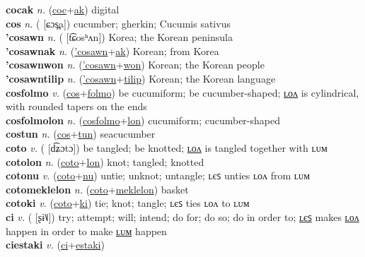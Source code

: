 \textbf{cocak} \textit{n.} (\hyperref[coc]{coc}+\hyperref[ak]{ak})
digital \label{cocak} \\
\textbf{cos} \textit{n.} ( [ɕɔs̪a])
cucumber; gherkin; Cucumis sativus \label{cos} \\
\textbf{'cosawn} \textit{n.} ( [t͡ɕosʰʌn])
Korea; the Korean peninsula \label{'cosawn} \\
\textbf{'cosawnak} \textit{n.} (\hyperref['cosawn]{'cosawn}+\hyperref[ak]{ak})
Korean; from Korea \label{'cosawnak} \\
\textbf{'cosawnwon} \textit{n.} (\hyperref['cosawn]{'cosawn}+\hyperref[won]{won})
Korean; the Korean people \label{'cosawnwon} \\
\textbf{'cosawntilip} \textit{n.} (\hyperref['cosawn]{'cosawn}+\hyperref[tilip]{tilip})
Korean; the Korean language \label{'cosawntilip} \\
\textbf{cosfolmo} \textit{v.} (\hyperref[cos]{cos}+\hyperref[folmo]{folmo})
be cucumiform; be cucumber-shaped; \hyperref[cosfolmolon]{ʟᴏᴧ} is cylindrical, with rounded tapers on the ends \label{cosfolmo} \\
\textbf{cosfolmolon} \textit{n.} (\hyperref[cosfolmo]{cosfolmo}+\hyperref[lon]{lon})
cucumiform; cucumber-shaped \label{cosfolmolon} \\
\textbf{costun} \textit{n.} (\hyperref[cos]{cos}+\hyperref[tun]{tun})
seacucumber \label{costun} \\
\textbf{coto} \textit{v.} ( [d͡ʑɔtɔ])
be tangled; be knotted; \hyperref[cotolon]{ʟᴏᴧ} is tangled together with ʟᴜᴍ \label{coto} \\
\textbf{cotolon} \textit{n.} (\hyperref[coto]{coto}+\hyperref[lon]{lon})
knot; tangled; knotted \label{cotolon} \\
\textbf{cotonu} \textit{v.} (\hyperref[coto]{coto}+\hyperref[nu]{nu})
untie; unknot; untangle; ʟєꜱ unties ʟᴏᴧ from ʟᴜᴍ \label{cotonu} \\
\textbf{cotomeklelon} \textit{n.} (\hyperref[coto]{coto}+\hyperref[meklelon]{meklelon})
basket \label{cotomeklelon} \\
\textbf{cotoki} \textit{v.} (\hyperref[coto]{coto}+\hyperref[ki]{ki})
tie; knot; tangle; ʟєꜱ ties ʟᴏᴧ to ʟᴜᴍ \label{cotoki} \\
\textbf{ci} \textit{v.} ( [ʂɨ˥˩])
try; attempt; will; intend; do for; do so; do in order to; \hyperref[ciles]{ʟєꜱ} makes \hyperref[cilon]{ʟᴏᴧ} happen in order to make \hyperref[cilum]{ʟᴜᴍ} happen \label{ci} \\
\textbf{ciestaki} \textit{v.} (\hyperref[ci]{ci}+\hyperref[estaki]{estaki})

